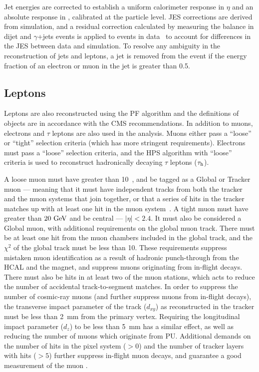 Jet energies are corrected to establish a uniform calorimeter 
response in $\eta$ and an absolute response in \pt, calibrated at 
the particle level.  
\ac{JES} corrections are derived from simulation, and a residual correction calculated by measuring the \pt balance in dijet and $\gamma$+jets events is applied to events in data~\cite{JETJINST} to account for differences in the \ac{JES} between data and simulation.
To resolve any ambiguity in the reconstruction of jets and leptons, a jet is removed from the event if the energy fraction of an electron or muon in the jet is greater than 0.5.



\subsection{Leptons}
\label{sec:objectReco:lep}

Leptons are also reconstructed using the \ac{PF} algorithm and the definitions of objects are in accordance with the \ac{CMS} recommendations.
In addition to muons, electrons and $\tau$ leptons are also used in the analysis.
Muons either pass a ``loose'' or ``tight'' selection criteria (which has more stringent requirements). 
Electrons must pass a ``loose'' selection criteria, and the \ac{HPS} algorithm with ``loose'' criteria is used to reconstruct hadronically decaying $\tau$ leptons ($\tau_\mathrm{h}$).

A loose muon must have \pt{} greater than 10~\GeV{}, and be tagged as a Global or Tracker muon --- meaning that it must
have independent tracks from both the tracker and the muon systems that join together, or that a series of hits in the tracker matches up with at least one hit in the muon system~\cite{CMS-PAPER-MUO-10-004}. 
%
A tight muon must have \pt\,greater than $20~\mathrm{GeV}$ and be central --- $|\eta|<2.4$. 
It must also be considered a Global muon, with additional requirements on the global muon track. 
There must be at least one hit from the muon chambers included in the global track, and the $\chi^{2}$ of the global track must be less than 10. These requirements suppress mistaken muon identification as a result of hadronic punch-through from the \ac{HCAL} and the magnet, and suppress muons originating from in-flight decays.
There must also be hits in at least two of the muon stations, which acts to reduce the number of accidental track-to-segment matches.
In order to suppress the number of cosmic-ray muons (and further suppress muons from in-flight decays), the transverse impact parameter of the track ($d_{xy}$) as reconstructed in the tracker must be less than 2~mm from the primary vertex. 
Requiring the longitudinal impact parameter ($d_{z}$) to be less than 5~mm has a similar effect, as well as reducing the number of muons which originate from \ac{PU}.
Additional demands on the number of hits in the pixel system ($>0$) and the number of tracker layers with hits ($>5$) further suppress in-flight muon decays, and guarantee a good measurement of the muon \pt{}.

